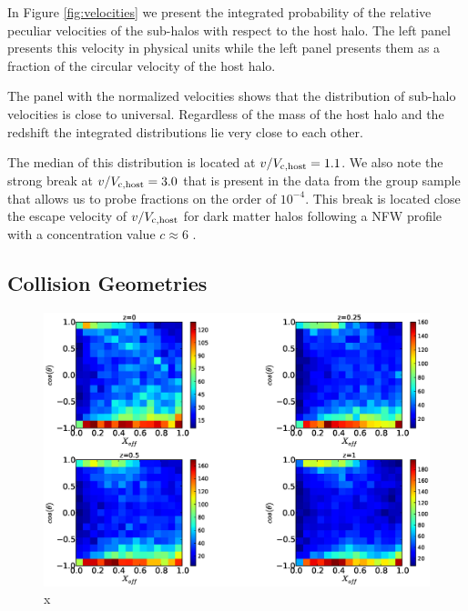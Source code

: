 \documentclass{emulateapj}
\begin{document}
In Figure \ref{fig:velocities} we present the integrated probability
of the relative peculiar velocities of the sub-halos with respect to
the host halo. The left panel presents this velocity in physical units
while the left panel presents them as a fraction of the circular
velocity of the host halo.  


The panel with the normalized velocities shows that the distribution
of sub-halo velocities is close to universal. Regardless of the mass
of the host halo and the redshift the integrated distributions lie
very close to each other.  


The median of this distribution is located at $v/V_{\rm
  c,host}=1.1$. We also note the strong break at $v/V_{\rm
  c,host}=3.0$ that is present in the data from the group sample that
allows us to probe fractions on the order of $10^{-4}$.  This break is
located close the escape velocity of $v/V_{\rm c,host}$ for dark
matter halos following a NFW profile with a concentration value
$c\approx 6$ \citep{Hayashi2006}.  



\subsection{Collision Geometries}
\label{fig:geometry}

\begin{figure}
\begin{center}
\includegraphics[width=1.0\textwidth]{Figures_eps/figure_4_300kms_700kms.eps}
\end{center}
\caption{x}
\label{fig:geometry}
\end{figure}
\end{document}
